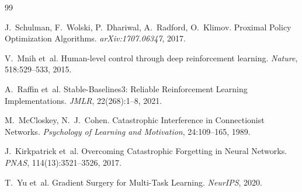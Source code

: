 \documentclass[10pt,a4paper,twocolumn]{article}
\begin{document}
\begin{thebibliography}{99}

J.~Schulman, F.~Wolski, P.~Dhariwal, A.~Radford, O.~Klimov.
\newblock Proximal Policy Optimization Algorithms.
\newblock \textit{arXiv:1707.06347}, 2017.

V.~Mnih et~al.
\newblock Human-level control through deep reinforcement learning.
\newblock \textit{Nature}, 518:529--533, 2015.

A.~Raffin et~al.
\newblock Stable-Baselines3: Reliable Reinforcement Learning Implementations.
\newblock \textit{JMLR}, 22(268):1--8, 2021.

M.~McCloskey, N.~J.~Cohen.
\newblock Catastrophic Interference in Connectionist Networks.
\newblock \textit{Psychology of Learning and Motivation}, 24:109--165, 1989.

J.~Kirkpatrick et~al.
\newblock Overcoming Catastrophic Forgetting in Neural Networks.
\newblock \textit{PNAS}, 114(13):3521--3526, 2017.

T.~Yu et~al.
\newblock Gradient Surgery for Multi-Task Learning.
\newblock \textit{NeurIPS}, 2020.

\end{thebibliography}
\end{document}

